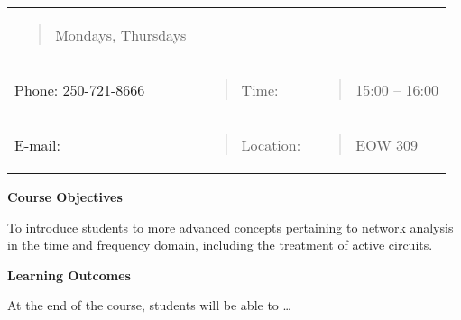 \begin{longtable}[]{@{}lll@{}}
\begin{minipage}[t]{0.32\columnwidth}
\begin{quote}
Mondays, Thursdays
\end{quote}\strut
\end{minipage}\tabularnewline
\begin{minipage}[t]{0.32\columnwidth}\raggedright\strut
Phone: 250-721-8666\strut
\end{minipage} & \begin{minipage}[t]{0.32\columnwidth}\raggedright\strut
\begin{quote}
Time:
\end{quote}\strut
\end{minipage} & \begin{minipage}[t]{0.32\columnwidth}\raggedright\strut
\begin{quote}
15:00 -- 16:00
\end{quote}\strut
\end{minipage}\tabularnewline
\begin{minipage}[t]{0.32\columnwidth}\raggedright\strut
E-mail:\strut
\end{minipage} & \begin{minipage}[t]{0.32\columnwidth}\raggedright\strut
\begin{quote}
Location:
\end{quote}\strut
\end{minipage} & \begin{minipage}[t]{0.32\columnwidth}\raggedright\strut
\begin{quote}
EOW 309
\end{quote}\strut
\end{minipage}\tabularnewline
\bottomrule
\end{longtable}

\textbf{Course Objectives}

To introduce students to more advanced concepts pertaining to network
analysis in the time and frequency domain, including the treatment of
active circuits.

\textbf{Learning Outcomes}

At the end of the course, students will be able to \ldots{}

